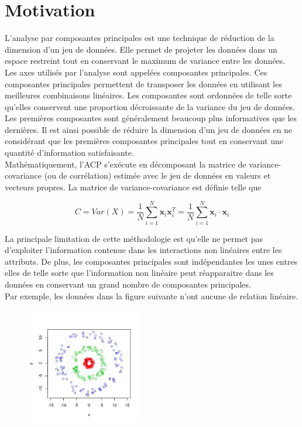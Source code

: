 \section{Motivation}

L’analyse par composantes principales est une technique de réduction de la dimension d’un jeu de données. Elle permet de projeter les données dans un espace restreint tout en conservant le maximum de variance entre les données. 
Les axes utilisés par l’analyse sont appelées composantes principales. Ces composantes principales permettent de transposer les 
données en utilisant les meilleures combinaisons linéaires. Les composantes sont ordonnées de telle sorte qu’elles conservent
 une proportion décroissante de la variance du jeu de données. Les premières composantes sont généralement beaucoup plus 
 informatives que les dernières. Il est ainsi possible de réduire la dimension d’un jeu de données en ne considérant que les premières composantes principales tout en conservant une quantité d’information satisfaisante.\\

Mathématiquement, l’ACP s'exécute en décomposant la matrice de variance-covariance (ou de corrélation) estimée avec le jeu de données en valeurs et vecteurs propres. La matrice de variance-covariance est définie telle que

$$C = Var(X) = \frac{1}{N} \sum_{i = 1}^{N}   \textbf{x}_i\textbf{x}_i^{T} = \frac{1}{N} \sum_{i = 1}^{N}   \textbf{x}_i \cdot \textbf{x}_i$$

La principale limitation de cette méthodologie est qu’elle ne permet pas d’exploiter l’information contenue dans les interactions non linéaires entre les attributs. De plus, les composantes principales sont indépendantes les unes entres elles de telle sorte que l'information non linéaire peut réapparaitre dans les données en conservant un grand nombre de composantes principales. \\

Par exemple, les données dans la figure suivante n'ont aucune de relation linéaire. 

\begin{figure}[H]
	\centering
	\includegraphics[width=2in]{sim-cercle}
\end{figure}

